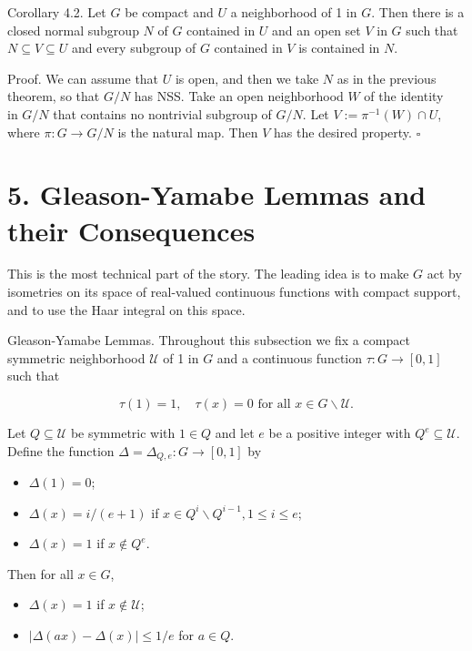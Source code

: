 \documentclass[10pt]{article}
\begin{document}
Corollary 4.2. Let $G$ be compact and $U$ a neighborhood of 1 in $G$. Then there is a closed normal subgroup $N$ of $G$ contained in $U$ and an open set $V$ in $G$ such that $N \subseteq V \subseteq U$ and every subgroup of $G$ contained in $V$ is contained in $N$.

Proof. We can assume that $U$ is open, and then we take $N$ as in the previous theorem, so that $G / N$ has NSS. Take an open neighborhood $W$ of the identity\\
in $G / N$ that contains no nontrivial subgroup of $G / N$. Let $V:=\pi^{-1}(W) \cap U$, where $\pi: G \rightarrow G / N$ is the natural map. Then $V$ has the desired property. \(\square\)

\section*{5. Gleason-Yamabe Lemmas and their Consequences}
This is the most technical part of the story. The leading idea is to make $G$ act by isometries on its space of real-valued continuous functions with compact support, and to use the Haar integral on this space.

Gleason-Yamabe Lemmas. Throughout this subsection we fix a compact symmetric neighborhood $\mathcal{U}$ of 1 in $G$ and a continuous function $\tau: G \rightarrow[0,1]$ such that

$$
\tau(1)=1, \quad \tau(x)=0 \text { for all } x \in G \backslash \mathcal{U} .
$$

Let $Q \subseteq \mathcal{U}$ be symmetric with $1 \in Q$ and let $e$ be a positive integer with $Q^{e} \subseteq \mathcal{U}$. Define the function $\Delta=\Delta_{Q, e}: G \rightarrow[0,1]$ by

\begin{itemize}
  \item[(i)] $\Delta(1)=0$;
  \item[(ii)] $\Delta(x)=i /(e+1)$ if $x \in Q^{i} \backslash Q^{i-1}, 1 \leq i \leq e$;
  \item[(iii)] $\Delta(x)=1$ if $x \notin Q^{e}$.
\end{itemize}

Then for all $x \in G$,

\begin{itemize}
  \item[(iv)] $\Delta(x)=1$ if $x \notin \mathcal{U}$;
  \item[(v)] $|\Delta(a x)-\Delta(x)| \leq 1 / e$ for $a \in Q$.
\end{itemize}
\end{document}
